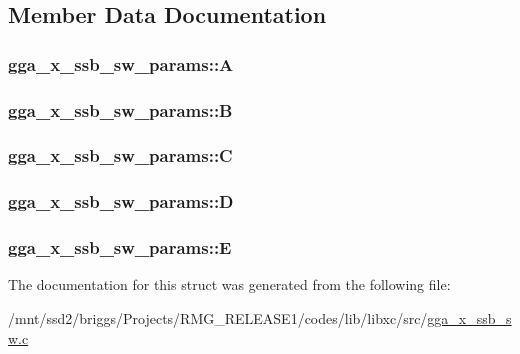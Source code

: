 \subsection{Member Data Documentation}
\hypertarget{structgga__x__ssb__sw__params_a0affa662508df3020cfab58cb8334fd0}{
\subsubsection[{A}]{ gga\-\_\-x\-\_\-ssb\-\_\-sw\-\_\-params\-::\-A}}\label{structgga__x__ssb__sw__params_a0affa662508df3020cfab58cb8334fd0}
\hypertarget{structgga__x__ssb__sw__params_a06f2af586d00e148954ba93fab95227c}{
\subsubsection[{B}]{ gga\-\_\-x\-\_\-ssb\-\_\-sw\-\_\-params\-::\-B}}\label{structgga__x__ssb__sw__params_a06f2af586d00e148954ba93fab95227c}
\hypertarget{structgga__x__ssb__sw__params_a38600926b72c57ec4008a2ae6a9ffbb1}{
\subsubsection[{C}]{ gga\-\_\-x\-\_\-ssb\-\_\-sw\-\_\-params\-::\-C}}\label{structgga__x__ssb__sw__params_a38600926b72c57ec4008a2ae6a9ffbb1}
\hypertarget{structgga__x__ssb__sw__params_a79e2bac7e20eda6c32f450078feb18e1}{
\subsubsection[{D}]{ gga\-\_\-x\-\_\-ssb\-\_\-sw\-\_\-params\-::\-D}}\label{structgga__x__ssb__sw__params_a79e2bac7e20eda6c32f450078feb18e1}
\hypertarget{structgga__x__ssb__sw__params_af27cc735acaf829c87fe911fd1f7f372}{
\subsubsection[{E}]{ gga\-\_\-x\-\_\-ssb\-\_\-sw\-\_\-params\-::\-E}}\label{structgga__x__ssb__sw__params_af27cc735acaf829c87fe911fd1f7f372}


The documentation for this struct was generated from the following file\-:\begin{DoxyCompactItemize}
\item 
/mnt/ssd2/briggs/\-Projects/\-R\-M\-G\-\_\-\-R\-E\-L\-E\-A\-S\-E1/codes/lib/libxc/src/\hyperlink{gga__x__ssb__sw_8c}{gga\-\_\-x\-\_\-ssb\-\_\-sw.\-c}\end{DoxyCompactItemize}

